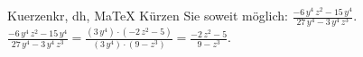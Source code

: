 \begin{MAufgabe}{Kuerzen}{kr, dh, MaTeX}
K\"urzen Sie soweit m\"oglich: $\frac{ - 6\, y^4\, z^2 - 15\, y^4}{27\, y^4 - 3\, y^4\, z^3}$.\\ 
\ifLsg\MLoesung
\quad $\frac{ - 6\, y^4\, z^2 - 15\, y^4}{27\, y^4 - 3\, y^4\, z^3}=\frac{(3\, y^4)\cdot( - 2\, z^2 - 5)}{(3\, y^4)\cdot(9 - z^3)}=\frac{ - 2\, z^2 - 5}{9 - z^3}$.\else\relax\fi
 \end{MAufgabe}